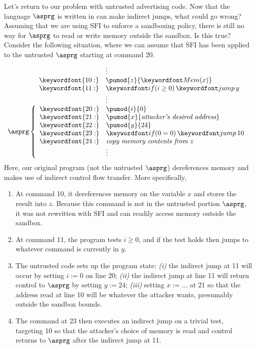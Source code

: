 \documentclass[11pt,twoside]{scrartcl}
\begin{document}
Let's return to our problem with untrusted advertising code.
Now that the language $\asprg$ is written in can make indirect jumps, what could go wrong? Assuming that we are using SFI to enforce a sandboxing policy, there is still no way for $\asprg$ to read or write memory outside the sandbox. Is this true? Consider the following situation, where we can assume that SFI has been applied to the untrusted $\asprg$ starting at command 20.
\[
\begin{array}{l}
\phantom{\asprg\Big\{\ }
\begin{array}{ll}
& \vdots \\
\keywordfont{10:} & \pumod{z}{\pderef{x}} \\
\keywordfont{11:} & \pifjump{i\ge0}{y} \\
& \vdots \\
\end{array}
\\
\asprg\left\{
\begin{array}{ll}
\keywordfont{20:} & \pumod{i}{0} \\
\keywordfont{21:} & \pumod{x}{\textit{attacker's desired address}} \\
\keywordfont{22:} & \pumod{y}{24} \\
\keywordfont{23:} & \pifjump{0=0}{10} \\
\keywordfont{24:} & \textit{copy memory contents from}~z~ \\
& \vdots \\
\end{array}
\right.
\end{array}
\]
Here, our original program (not the untrusted $\asprg$) dereferences memory and makes use of indirect control flow transfer. More specifically,
\begin{enumerate}
\item At command 10, it dereferences memory on the variable $x$ and stores the result into $z$. Because this command is not in the untrusted portion $\asprg$, it was not rewritten with SFI and can readily access memory outside the sandbox.
\item At command 11, the program tests $i\ge0$, and if the test holds then jumps to whatever command is currently in $y$.
\item The untrusted code sets up the program state: \emph{(i)} the indirect jump at 11 will occur by setting $i:=0$ on line 20; \emph{(ii)} the indirect jump at line 11 will return control to $\asprg$ by setting $y:=24$; \emph{(iii)} setting $x:=\ldots$ at 21 so that the address read at line 10 will be whatever the attacker wants, presumably outside the sandbox bounds.
\item The command at 23 then executes an indirect jump on a trivial test, targeting 10 so that the attacker's choice of memory is read and control returns to $\asprg$ after the indirect jump at 11.
\end{enumerate}
\end{document}
